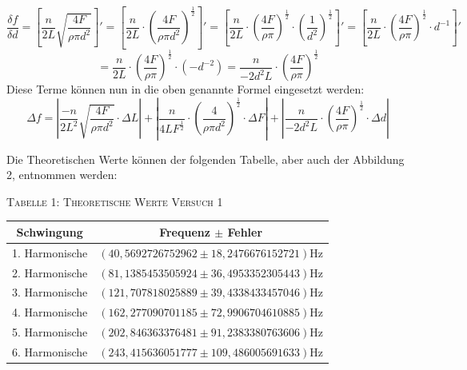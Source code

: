 \documentclass[11pt, a4Paper]{article}
\begin{document}
$$\frac{\delta f}{\delta d}=\left[\frac{n}{2L}\sqrt{\frac{4F}{\rho\pi d^2}} \right]' =\left[\frac{n}{2L}\cdot (\frac{4F}{\rho\pi d^2})^{\frac{1}{2}} \right]' =\left[\frac{n}{2L}\cdot (\frac{4F}{\rho\pi})^{\frac{1}{2}}\cdot (\frac{1}{d^2})^{\frac{1}{2}} \right]' =\left[\frac{n}{2L}\cdot (\frac{4F}{\rho\pi})^{\frac{1}{2}}\cdot d^{-1} \right]'$$ $$ =\frac{n}{2L}\cdot (\frac{4F}{\rho\pi})^{\frac{1}{2}}\cdot (-d^{-2}) =\frac{n}{-2d^2L}\cdot (\frac{4F}{\rho\pi})^{\frac{1}{2}}$$
Diese Terme können nun in die oben genannte Formel eingesetzt werden: $$\Delta f=\left|\frac{-n}{2L^2}\sqrt{\frac{4F}{\rho\pi d^2}}\cdot\Delta L\right|+\left|\frac{n}{4LF^{\frac{1}{2}}}\cdot(\frac{4}{\rho\pi d^2})^{\frac{1}{2}}\cdot \Delta F\right|+\left|\frac{n}{-2d^2L}\cdot (\frac{4F}{\rho\pi})^{\frac{1}{2}}\cdot\Delta d\right|$$

Die Theoretischen Werte können der folgenden Tabelle, aber auch der Abbildung 2, entnommen werden:
\begin{flushleft}
\textsc{Tabelle 1: Theoretische Werte Versuch 1}
\end{flushleft}

\begin{tabular}{cc}
Schwingung & Frequenz $\pm$ Fehler\\
\hline
1. Harmonische & $(40,5692726752962 \pm 18,2476676152721)$Hz\\
2. Harmonische & $(81,1385453505924 \pm 36,4953352305443)$Hz\\
3. Harmonische & $(121,707818025889 \pm 39,4338433457046)$Hz\\
4. Harmonische & $(162,277090701185 \pm 72,9906704610885)$Hz\\
5. Harmonische & $(202,846363376481 \pm 91,2383380763606)$Hz\\
6. Harmonische & $(243,415636051777 \pm 109,486005691633)$Hz\\
\end{tabular}\\
\end{document}
